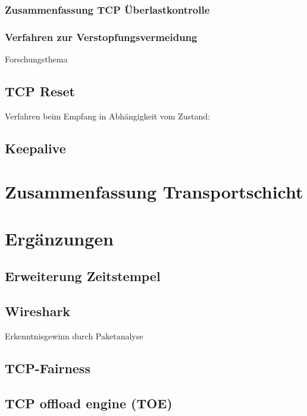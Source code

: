 \subsubsection{Zusammenfassung TCP Überlastkontrolle}
\subsubsection{Verfahren zur Verstopfungsvermeidung}
Forschungsthema

\subsection{TCP Reset}
Verfahren beim Empfang in Abhängigkeit vom Zustand:

\subsection{Keepalive}

\section{Zusammenfassung Transportschicht}

\section{Ergänzungen}
\subsection{Erweiterung Zeitstempel}
\subsection{Wireshark}
Erkenntnisgewinn durch Paketanalyse
\subsection{TCP-Fairness}
\subsection{TCP offload engine (TOE)}
